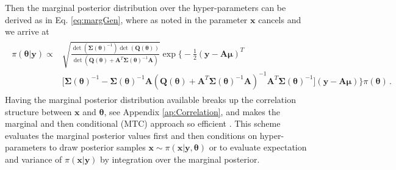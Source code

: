 Then the marginal posterior distribution over the hyper-parameters can be derived as in Eq. \ref{eq:margGen}, where as noted in \cite{fox2016fast} the parameter $\bm{x}$ cancels and we arrive at
\begin{align}\begin{split}
	\pi(\bm{\theta} | \bm{y}) \propto & \sqrt{\frac{\det{(\bm{\Sigma}(\bm{\theta})^{-1})} \det{(\bm{Q}(\bm{\theta}))} }{\det{(\bm{Q}(\bm{\theta}) + \bm{A}^T \bm{\Sigma}(\bm{\theta})^{-1} \bm{A})} } }  \exp \Bigg\{  -\frac{1}{2} (\bm{y} - \bm{A} \bm{\mu})^T \\ &\big[ \bm{\Sigma}(\bm{\theta})^{-1} - \bm{\Sigma}(\bm{\theta})^{-1} \bm{A}  (\bm{Q}(\bm{\theta}) + \bm{A}^T \bm{\Sigma}(\bm{\theta})^{-1} \bm{A})^{-1} \bm{A}^T \bm{\Sigma} (\bm{\theta})^{-1} \big] (\bm{y} - \bm{A} \bm{\mu}) \Bigg\} \pi(\bm{\theta}) \, .
	\end{split} 
\end{align} 
Having the marginal posterior distribution available breaks up the correlation structure between $\bm{x}$ and $\bm{\theta}$, see Appendix \ref{ap:Correlation}, and makes the marginal and then conditional (MTC) approach so efficient \cite{fox2016fast}.
This scheme evaluates the marginal posterior values first and then conditions on hyper-parameters to draw posterior samples $\bm{x} \sim \pi (\bm{x} | \bm{y}, \bm{\theta})$ or to evaluate expectation and variance of $\pi(\bm{x}| \bm{y})$ by integration over the marginal posterior.


